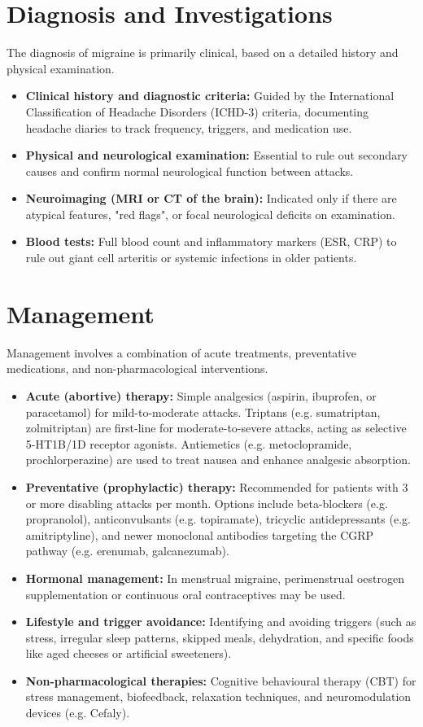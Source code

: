 \section*{Diagnosis and Investigations}
The diagnosis of migraine is primarily clinical, based on a detailed history and physical examination.
\begin{itemize}
    \item \textbf{Clinical history and diagnostic criteria:} Guided by the International Classification of Headache Disorders (ICHD-3) criteria, documenting headache diaries to track frequency, triggers, and medication use.
    \item \textbf{Physical and neurological examination:} Essential to rule out secondary causes and confirm normal neurological function between attacks.
    \item \textbf{Neuroimaging (MRI or CT of the brain):} Indicated only if there are atypical features, "red flags", or focal neurological deficits on examination.
    \item \textbf{Blood tests:} Full blood count and inflammatory markers (ESR, CRP) to rule out giant cell arteritis or systemic infections in older patients.
\end{itemize}

\section*{Management}
Management involves a combination of acute treatments, preventative medications, and non-pharmacological interventions.
\begin{itemize}
    \item \textbf{Acute (abortive) therapy:} Simple analgesics (aspirin, ibuprofen, or paracetamol) for mild-to-moderate attacks. Triptans (e.g. sumatriptan, zolmitriptan) are first-line for moderate-to-severe attacks, acting as selective 5-HT1B/1D receptor agonists. Antiemetics (e.g. metoclopramide, prochlorperazine) are used to treat nausea and enhance analgesic absorption.
    \item \textbf{Preventative (prophylactic) therapy:} Recommended for patients with 3 or more disabling attacks per month. Options include beta-blockers (e.g. propranolol), anticonvulsants (e.g. topiramate), tricyclic antidepressants (e.g. amitriptyline), and newer monoclonal antibodies targeting the CGRP pathway (e.g. erenumab, galcanezumab).
    \item \textbf{Hormonal management:} In menstrual migraine, perimenstrual oestrogen supplementation or continuous oral contraceptives may be used.
    \item \textbf{Lifestyle and trigger avoidance:} Identifying and avoiding triggers (such as stress, irregular sleep patterns, skipped meals, dehydration, and specific foods like aged cheeses or artificial sweeteners).
    \item \textbf{Non-pharmacological therapies:} Cognitive behavioural therapy (CBT) for stress management, biofeedback, relaxation techniques, and neuromodulation devices (e.g. Cefaly).
\end{itemize}

